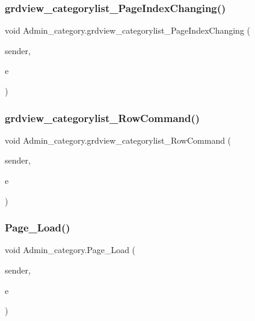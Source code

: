 \subsubsection{\texorpdfstring{grdview\_categorylist\_PageIndexChanging()}{grdview\_categorylist\_PageIndexChanging()}}
{\footnotesize\ttfamily void Admin\+\_\+category.\+grdview\+\_\+categorylist\+\_\+\+Page\+Index\+Changing (\begin{DoxyParamCaption}\item[{object}]{sender,  }\item[{Grid\+View\+Page\+Event\+Args}]{e }\end{DoxyParamCaption})\hspace{0.3cm}{\ttfamily [protected]}}

\mbox{\label{class_admin__category_a470bfbac64460f46d6dae4625cbe8a51}} 
\subsubsection{\texorpdfstring{grdview\_categorylist\_RowCommand()}{grdview\_categorylist\_RowCommand()}}
{\footnotesize\ttfamily void Admin\+\_\+category.\+grdview\+\_\+categorylist\+\_\+\+Row\+Command (\begin{DoxyParamCaption}\item[{object}]{sender,  }\item[{Grid\+View\+Command\+Event\+Args}]{e }\end{DoxyParamCaption})\hspace{0.3cm}{\ttfamily [protected]}}

\mbox{\label{class_admin__category_aab4da6d83c0ea2ac289680b813bf7659}} 
\subsubsection{\texorpdfstring{Page\_Load()}{Page\_Load()}}
{\footnotesize\ttfamily void Admin\+\_\+category.\+Page\+\_\+\+Load (\begin{DoxyParamCaption}\item[{object}]{sender,  }\item[{Event\+Args}]{e }\end{DoxyParamCaption})\hspace{0.3cm}{\ttfamily [protected]}}



